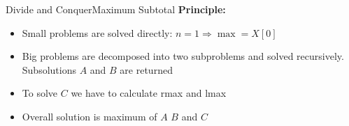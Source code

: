 
\begin{frame}{Divide and Conquer}{Maximum Subtotal}
  \textbf{Principle:}
  \begin{figure}[!h]
    \begin{adjustbox}{width=\linewidth}
      
    \end{adjustbox}
    \label{fig:divide_and_conquer:max_sub_total_divide2}
  \end{figure}
  \vspace{-1.5em}
  \begin{itemize}
    \item<2->
      Small problems are solved directly:
      {\color{MainA}$n = 1 \Rightarrow \max = X[0]$}
    \item<3->
      Big problems are decomposed into two subproblems and solved recursively.
      Subsolutions {\color{MainA}$A$} and {\color{MainA}$B$}
      are returned
    \item<4->
      To solve {\color{MainA}$C$} we have to calculate
      {\color{MainA}rmax} and {\color{MainA}lmax}
    \item<5->
      Overall solution is maximum of {\color{MainA}$A$}
      {\color{MainA}$B$} and {\color{MainA}$C$}
  \end{itemize}
\end{frame}


